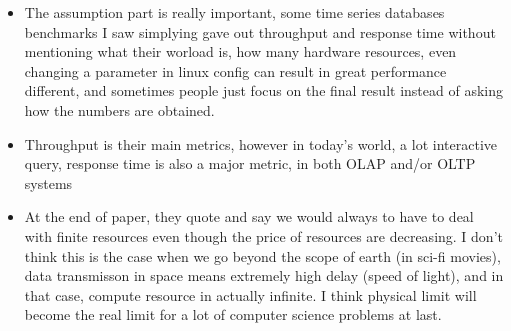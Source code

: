 \documentclass[12pt,a4paper,oneside]{article}
\begin{document}
\begin{itemize}
  \item The assumption part is really important, some time series databases benchmarks I saw simplying gave out throughput and response time
without mentioning what their worload is, how many hardware resources, even changing a parameter in linux config can result in great
performance different, and sometimes people just focus on the final result instead of asking how the numbers are obtained.
  \item Throughput is their main metrics, however in today's world, a lot interactive query, response time is also a major
metric, in both OLAP and/or OLTP systems
  \item At the end of paper, they quote and say we would always to have to deal with finite resources even though the price of resources are decreasing.
I don't think this is the case when we go beyond the scope of earth (in sci-fi movies), data transmisson in space means extremely high delay (speed of light),
and in that case, compute resource in actually infinite.
I think physical limit will become the real limit for a lot of computer science problems at last.
\end{itemize}
\end{document}
